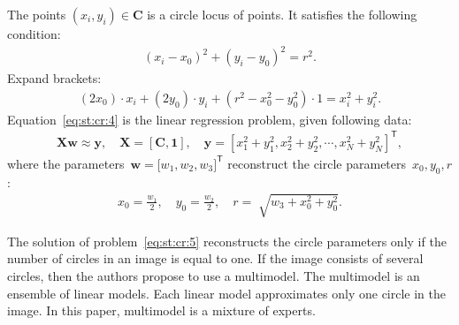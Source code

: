 \documentclass[12pt, twoside]{article}
\begin{document}
The points $\left(x_i, y_i\right)\in\textbf{C}$ is a circle locus of points. 
It satisfies the following condition:
\[
\label{eq:st:cr:3}
\begin{aligned}
\left(x_i - x_0\right)^{2}+\left(y_i-y_0\right)^2 = r^2.
\end{aligned}
\]
Expand brackets:
\[
\label{eq:st:cr:4}
\begin{aligned}
(2x_0)\cdot x_i + (2y_0)\cdot y_i+(r^2-x_0^2-y_0^2)\cdot1 = x_{i}^2 + y_{i}^2.
\end{aligned}
\]
Equation~\eqref{eq:st:cr:4} is the linear regression problem, given following data:
\[
\label{eq:st:cr:5}
\begin{aligned}
\textbf{X}\textbf{w} \approx \textbf{y},  \quad \textbf{X} = \left[\textbf{C}, \textbf{1}\right], \quad \textbf{y} = [x_1^2+y_1^2, x_2^2+y_2^2, \cdots, x_N^2+y_N^2]^{\mathsf{T}},
\end{aligned}
\]
where the parameters~$\textbf{w} = \bigr[w_1, w_2, w_3\bigr]^{\mathsf{T}}$ reconstruct the circle parameters~$x_0, y_0, r$:
\[
\label{eq:st:cr:6}
\begin{aligned}
x_0 = \frac{w_1}{2}, \quad y_0 = \frac{w_2}{2}, \quad r = \sqrt[]{w_3+x_{0}^{2}+y_{0}^{2}}.
\end{aligned}
\]

The solution of problem~\eqref{eq:st:cr:5} reconstructs the circle parameters only if the number of circles in an image is equal to one.
If the image consists of several circles, then the authors propose to use a multimodel.
The multimodel is an ensemble of linear models.
Each linear model approximates only one circle in the image.
In this paper, multimodel is a mixture of experts.
\end{document}
